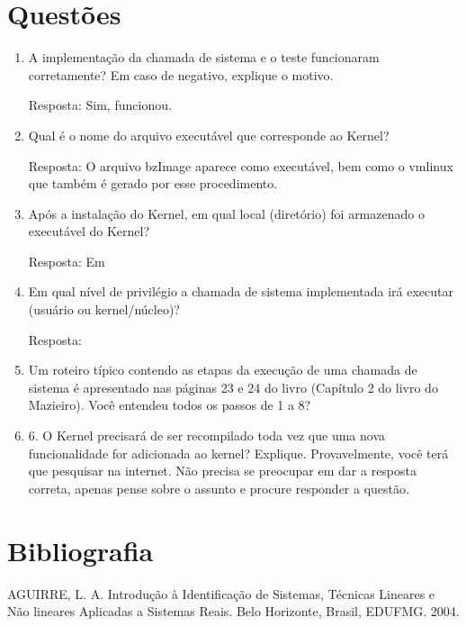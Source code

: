 \documentclass[a4paper, 12pt]{article}
\begin{document}
\section{Questões}
\begin{enumerate}
		\item A implementação da chamada de sistema e o teste funcionaram corretamente? Em caso de negativo, explique o motivo.
		
		Resposta: Sim, funcionou.
		
		\item Qual é o nome do arquivo executável que corresponde ao Kernel?
		
		Resposta: O arquivo bzImage aparece como executável, bem como o vmlinux que também é gerado por esse procedimento.
		
		\item Após a instalação do Kernel, em qual local (diretório) foi armazenado o executável do Kernel?
		
		Resposta: Em 
		
		\item Em qual nível de privilégio a chamada de sistema implementada irá executar (usuário ou kernel/núcleo)?
		
		Resposta: 
		
		\item Um roteiro típico contendo as etapas da execução de uma chamada de sistema é apresentado nas páginas 23 e 24 do livro (Capítulo 2 do livro do Mazieiro). Você entendeu todos os passos de 1 a 8?
		
		\item 6.	O Kernel precisará de ser recompilado toda vez que uma nova funcionalidade for adicionada ao kernel? Explique. Provavelmente, você terá que pesquisar na internet. Não precisa se preocupar em dar a resposta correta, apenas pense sobre o assunto e procure responder a questão.
		
	\end{enumerate}
\newpage

\section*{Bibliografia}
\footnotesize{

\noindent AGUIRRE, L. A. Introdução à Identificação de Sistemas, Técnicas Lineares e Não lineares Aplicadas a Sistemas Reais. Belo Horizonte, Brasil, EDUFMG. 2004.\\

}
\newpage
\end{document}
